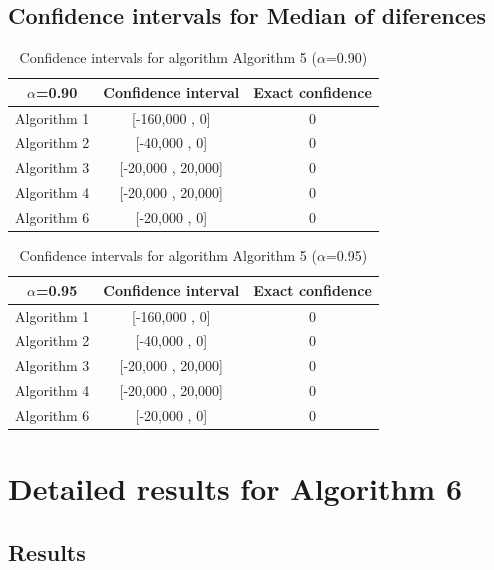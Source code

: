 \documentclass[a4paper,10pt]{article}
\begin{document}
\subsection{Confidence intervals for Median of diferences}

\begin{table}[!htp]
\centering\small
\begin{tabular}{
|c|c|c|}
\hline
 $\alpha$=0.90 & Confidence interval & Exact confidence \\ \hline 
Algorithm 1 & [-160,000 , 0] & 0\\ \hline 
Algorithm 2 & [-40,000 , 0] & 0\\ \hline 
Algorithm 3 & [-20,000 , 20,000] & 0\\ \hline 
Algorithm 4 & [-20,000 , 20,000] & 0\\ \hline 
Algorithm 6 & [-20,000 , 0] & 0\\ \hline 

\end{tabular}
\caption{Confidence intervals for algorithm Algorithm 5 ($\alpha$=0.90)}
\end{table}
\begin{table}[!htp]
\centering\small
\begin{tabular}{
|c|c|c|}
\hline
 $\alpha$=0.95 & Confidence interval & Exact confidence \\ \hline 
Algorithm 1 & [-160,000 , 0] & 0\\ \hline 
Algorithm 2 & [-40,000 , 0] & 0\\ \hline 
Algorithm 3 & [-20,000 , 20,000] & 0\\ \hline 
Algorithm 4 & [-20,000 , 20,000] & 0\\ \hline 
Algorithm 6 & [-20,000 , 0] & 0\\ \hline 

\end{tabular}
\caption{Confidence intervals for algorithm Algorithm 5 ($\alpha$=0.95)}
\end{table}

 \clearpage 


\section{Detailed results for Algorithm 6}


\subsection{Results}
\end{document}
